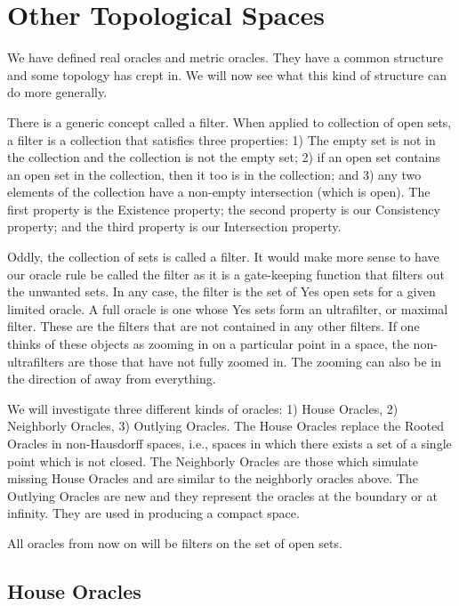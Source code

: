 \documentclass[12pt]{article}
\begin{document}
\section{Other Topological Spaces}

We have defined real oracles and metric oracles. They have a common structure and some topology has crept in. We will now see what this kind of structure can do more generally. 

There is a generic concept called a filter. When applied to collection of open sets, a filter is a collection that satisfies three properties: 1) The empty set is not in the collection and the collection is not the empty set; 2) if an open set contains an open set in the collection, then it too is in the collection; and 3) any two elements of the collection have a non-empty intersection (which is open). The first property is the Existence property; the second property is our Consistency property; and the third property is our Intersection property. 

Oddly, the collection of sets is called a filter. It would make more sense to have our oracle rule be called the filter as it is a gate-keeping function that filters out the unwanted sets. In any case, the filter is the set of Yes open sets for a given limited oracle. A full oracle is one whose Yes sets form an ultrafilter, or maximal filter. These are the filters that are not contained in any other filters. If one thinks of these objects as zooming in on a particular point in a space, the non-ultrafilters are those that have not fully zoomed in. The zooming can also be in the direction of away from everything. 

We will investigate three different kinds of oracles: 1) House Oracles, 2) Neighborly Oracles, 3) Outlying Oracles. The House Oracles replace the Rooted Oracles in non-Hausdorff spaces, i.e., spaces in which there exists a set of a single point which is not closed. The Neighborly Oracles are those which simulate missing House Oracles and are similar to the neighborly oracles above. The Outlying Oracles are new and they represent the oracles at the boundary or at infinity. They are used in producing a compact space. 

All oracles from now on will be filters on the set of open sets.

\subsection{House Oracles}
\end{document}
